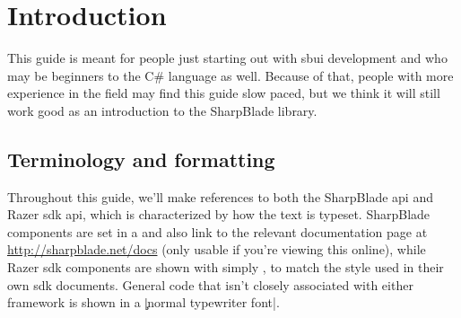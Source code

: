 \chapter{Introduction}
This guide is meant for people just starting out with \gls{sbui} development and who may be beginners to the C\# language as well. Because of that, people with more experience in the field may find this guide slow paced, but we think it will still work good as an introduction to the SharpBlade library.

\section{Terminology and formatting}
Throughout this guide, we'll make references to both the SharpBlade \gls{api} and Razer \gls{sdk} \gls{api}, which is characterized by how the text is typeset. SharpBlade components are set in a  and also link to the relevant documentation page at \url{http://sharpblade.net/docs} (only usable if you're viewing this online), while Razer \gls{sdk} components are shown with simply , to match the style used in their own \gls{sdk} documents. General code that isn't closely associated with either framework is shown in a \c|normal typewriter font|.
